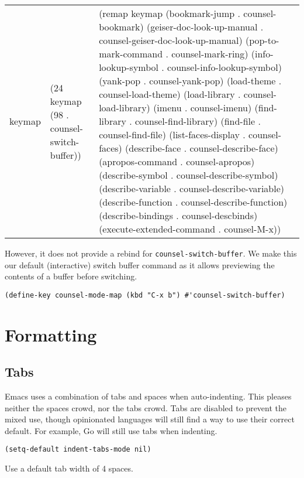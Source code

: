 \documentclass[11pt]{article}
\begin{document}
\begin{table}[htbp]
\label{tab:orge042f57}
\centering
\begin{tabular}{lll}
keymap & (24 keymap (98 . counsel-switch-buffer)) & (remap keymap (bookmark-jump . counsel-bookmark) (geiser-doc-look-up-manual . counsel-geiser-doc-look-up-manual) (pop-to-mark-command . counsel-mark-ring) (info-lookup-symbol . counsel-info-lookup-symbol) (yank-pop . counsel-yank-pop) (load-theme . counsel-load-theme) (load-library . counsel-load-library) (imenu . counsel-imenu) (find-library . counsel-find-library) (find-file . counsel-find-file) (list-faces-display . counsel-faces) (describe-face . counsel-describe-face) (apropos-command . counsel-apropos) (describe-symbol . counsel-describe-symbol) (describe-variable . counsel-describe-variable) (describe-function . counsel-describe-function) (describe-bindings . counsel-descbinds) (execute-extended-command . counsel-M-x))\\
\end{tabular}
\end{table}

However, it does not provide a rebind for \texttt{counsel-switch-buffer}. We make this
our default (interactive) switch buffer command as it allows previewing the
contents of a buffer before switching.

\begin{verbatim}
(define-key counsel-mode-map (kbd "C-x b") #'counsel-switch-buffer)
\end{verbatim}
\section{Formatting}
\label{sec:orgfaa509f}

\subsection{Tabs}
\label{sec:org7d0b79b}

Emacs uses a combination of tabs and spaces when auto-indenting. This pleases
neither the spaces crowd, nor the tabs crowd. Tabs are disabled to prevent the
mixed use, though opinionated languages will still find a way to use their
correct default. For example, Go will still use tabs when indenting.

\begin{verbatim}
(setq-default indent-tabs-mode nil)
\end{verbatim}

Use a default tab width of 4 spaces.
\end{document}
